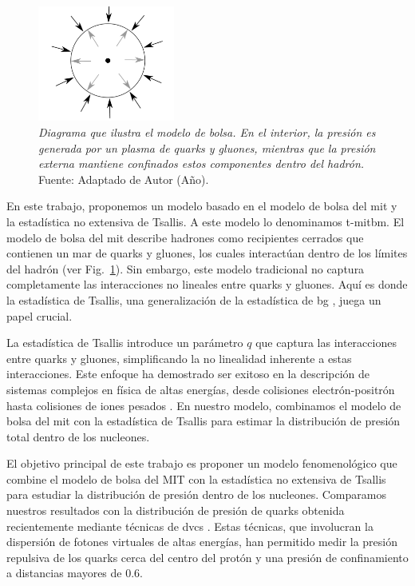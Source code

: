 \begin{figure}
    \centering
    \includegraphics[width=0.4\textwidth]{./Images/Bag model.png}
    \caption[Diagrama de bolsa]{\emph{Diagrama que ilustra el modelo de bolsa. En el interior, la presión es generada por un plasma de quarks y gluones, mientras que la presión externa mantiene confinados estos componentes dentro del hadrón.} Fuente: Adaptado de Autor (Año).}
    \label{fig:Bolsa }
\end{figure}

En este trabajo, proponemos un modelo basado en el modelo de bolsa del \acrfull{mit} \cite{Chodos_1974,Chodos1974a} y la estadística no extensiva de Tsallis. A este modelo lo denominamos \acrfull{t-mitbm}. El modelo de bolsa del \acrshort{mit} describe hadrones como recipientes cerrados que contienen un mar de quarks y gluones, los cuales interactúan dentro de los límites del hadrón (ver Fig.~\ref{fig:Bolsa }). Sin embargo, este modelo tradicional no captura completamente las interacciones no lineales entre quarks y gluones. Aquí es donde la estadística de Tsallis, una generalización de la estadística de \acrfull{bg} \cite{Tsallis1988,Beck_2003,Tsallis2009,Tsallis_2014,Tsallis_2009}, juega un papel crucial.

La estadística de Tsallis introduce un parámetro $q$ que captura las interacciones entre quarks y gluones, simplificando la no linealidad inherente a estas interacciones. Este enfoque ha demostrado ser exitoso en la descripción de sistemas complejos en física de altas energías, desde colisiones electrón-positrón \cite{Bediaga_2000,Collaboration1984} hasta colisiones de iones pesados \cite{Saraswat_2018,Saraswat_2017}. En nuestro modelo, combinamos el modelo de bolsa del \acrshort{mit} con la estadística de Tsallis para estimar la distribución de presión total dentro de los nucleones.

El objetivo principal de este trabajo es proponer un modelo fenomenológico que combine el modelo de bolsa del MIT con la estadística no extensiva de Tsallis para estudiar la distribución de presión dentro de los nucleones. Comparamos nuestros resultados con la distribución de presión de quarks obtenida recientemente mediante técnicas de \acrfull{dvcs} \cite{Burkert_2018}. Estas técnicas, que involucran la dispersión de fotones virtuales de altas energías, han permitido medir la presión repulsiva de los quarks cerca del centro del protón y una presión de confinamiento a distancias mayores de $0.6$.

